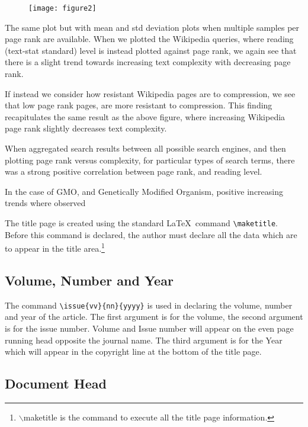 \documentclass{clv3}
\begin{document}
\begin{figure}
	\centering
	\texttt{[image: figure2]}
	\caption{}
	\label{fig:figure2}
\end{figure}


The same plot but with mean and std deviation plots when multiple samples per page rank are available. When we plotted the Wikipedia queries, where reading (text-stat standard) level is instead plotted against page rank, we again see that there is a slight trend towards increasing text complexity with decreasing page rank. 


If instead we consider how resistant Wikipedia pages are to compression, we see that low page rank pages, are more resistant to compression. This finding recapitulates the same result as the above figure, where increasing Wikipedia page rank slightly decreases text complexity.

When aggregated search results between all possible search engines, and then plotting page rank versus complexity, for particular types of search terms, there was a strong positive correlation between page rank, and reading level.

In the case of GMO, and Genetically Modified Organism, positive increasing trends where observed

The title page is created using the standard \LaTeX\ command \verb|\maketitle|.
Before this command is declared, the author must declare all the data which are
to appear in the title area.\footnote{$\backslash$maketitle is the command to execute all the title page information.}

\subsection{Volume, Number and Year}

The command \verb|\issue{vv}{nn}{yyyy}| is used in declaring the volume, number
and year of the article. The first argument is for the volume, the second argument
is for the issue number. Volume and Issue number will appear on the even page
running head opposite the journal name. The third argument is for the Year which
will appear in the copyright line at the bottom of the title page.

\subsection{Document Head}
\end{document}
